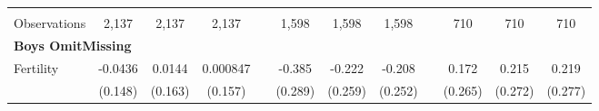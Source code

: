 \begin{landscape}
\begin{table}[htpb!]
\begin{center}
\begin{tabular}{lcccp{2mm}cccp{2mm}ccc}
\begin{footnotesize}\end{footnotesize}&\begin{footnotesize}\end{footnotesize}&\begin{footnotesize}\end{footnotesize}&\begin{footnotesize}\end{footnotesize}&\begin{footnotesize}\end{footnotesize}&\begin{footnotesize}\end{footnotesize}&\begin{footnotesize}\end{footnotesize}&\begin{footnotesize}\end{footnotesize}&\begin{footnotesize}\end{footnotesize}&\begin{footnotesize}\end{footnotesize}&\begin{footnotesize}\end{footnotesize}&\begin{footnotesize}\end{footnotesize}\\Observations&2,137&2,137&2,137&&1,598&1,598&1,598&&710&710&710\\
\multicolumn{12}{l}{\textbf{Boys OmitMissing}}\\ 
Fertility&-0.0436&0.0144&0.000847&&-0.385&-0.222&-0.208&&0.172&0.215&0.219\\
&(0.148)&(0.163)&(0.157)&&(0.289)&(0.259)&(0.252)&&(0.265)&(0.272)&(0.277)\\

\end{tabular}
\end{center}
\end{table}
\end{landscape}
